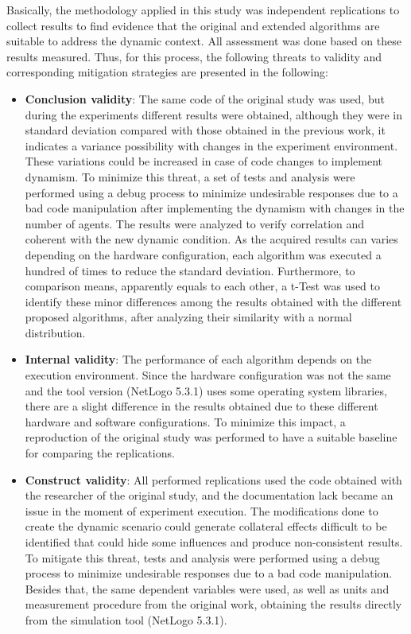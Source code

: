 
Basically, the methodology applied in this study was independent replications to collect results to find evidence that the original and extended algorithms are suitable to address the dynamic context. All assessment was done based on these results measured. Thus, for this process, the following threats to validity and corresponding mitigation strategies are presented in the following: 

\begin{itemize}
   \item \textbf{Conclusion validity}: The same code of the original study was used, but during the experiments different results were obtained, although they were in standard deviation compared with those obtained in the previous work, it indicates a variance possibility with changes in the experiment environment. These variations could be increased in case of code changes to implement dynamism. To minimize this threat, a set of tests and analysis were performed using a debug process to minimize undesirable responses due to a bad code manipulation after implementing the dynamism with changes in the number of agents. The results were analyzed to verify correlation and coherent with the new dynamic condition. As the acquired results can varies depending on the hardware configuration, each algorithm was executed a hundred of times to reduce the standard deviation. Furthermore, to comparison means, apparently equals to each other, a t-Test was used to identify these minor differences among the results obtained with the different proposed algorithms, after analyzing their similarity with a normal distribution.
   \item \textbf{Internal validity}: The performance of each algorithm depends on the execution environment. Since the hardware configuration was not the same and the tool version (NetLogo 5.3.1) uses some operating system libraries, there are a slight difference in the results obtained due to these different hardware and software configurations. To minimize this impact, a reproduction of the original study \cite{MAS07} was performed to have a suitable baseline for comparing the replications.
   \item \textbf{Construct validity}: All performed replications used the code obtained with the researcher of the original study, and the documentation lack became an issue in the moment of experiment execution. The modifications done to create the dynamic scenario could generate collateral effects difficult to be identified that could hide some influences and produce non-consistent results. To mitigate this threat, tests and analysis were performed using a debug process to minimize undesirable responses due to a bad code manipulation. Besides that, the same dependent variables were used, as well as units and measurement procedure from the original work, obtaining the results directly from the simulation tool (NetLogo 5.3.1).

\end{itemize}

